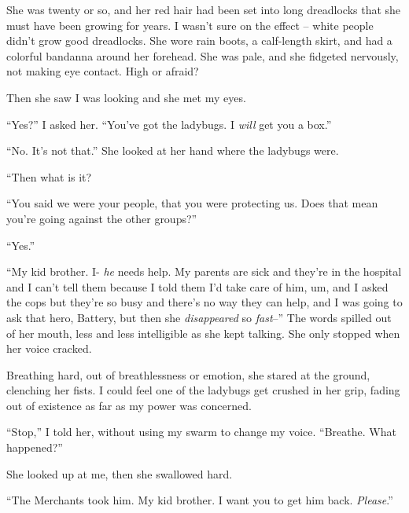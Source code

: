 She was twenty or so, and her red hair had been set into long dreadlocks that she must have been growing for years.  I wasn't sure on the effect – white people didn't grow good dreadlocks.  She wore rain boots, a calf-length skirt, and had a colorful bandanna around her forehead.  She was pale, and she fidgeted nervously, not making eye contact.  High or afraid?



Then she saw I was looking and she met my eyes.



``Yes?'' I asked her.  ``You've got the ladybugs.  I \emph{will} get you a box.''



``No.  It's not that.''  She looked at her hand where the ladybugs were.



``Then what is it?



``You said we were your people, that you were protecting us.  Does that mean you're going against the other groups?''



``Yes.''



``My kid brother.  I- \emph{he} needs help.  My parents are sick and they're in the hospital and I can't tell them because I told them I'd take care of him, um, and I asked the cops but they're so busy and there's no way they can help, and I was going to ask that hero, Battery, but then she \emph{disappeared} so \emph{fast}--''  The words spilled out of her mouth, less and less intelligible as she kept talking.  She only stopped when her voice cracked.



Breathing hard, out of breathlessness or emotion, she stared at the ground, clenching her fists.  I could feel one of the ladybugs get crushed in her grip, fading out of existence as far as my power was concerned.



``Stop,'' I told her, without using my swarm to change my voice.  ``Breathe.  What happened?''



She looked up at me, then she swallowed hard.



``The Merchants took him.  My kid brother.  I want you to get him back.  \emph{Please}.''





